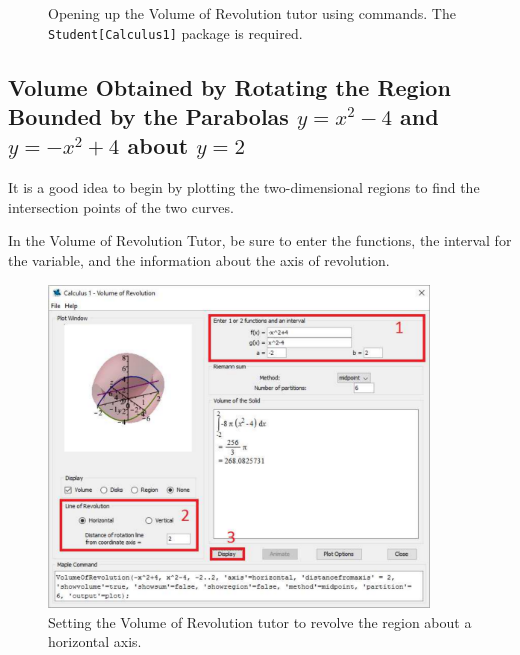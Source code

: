 \begin{figure}[h]
\caption{Opening up the Volume of Revolution tutor using commands. The \texttt{Student[Calculus1]} package is required.}
\centering
{}
\end{figure}

\newpage

\subsection{Volume Obtained by Rotating the Region Bounded by the Parabolas $y=x^2-4$ and $y=-x^2+4$ about $y=2$}


It is a good idea to begin by plotting the two-dimensional regions to find the intersection points of the two curves.

\begin{maplegroup}
\begin{mapleinput}
\end{mapleinput}
\mapleresult
{}
\end{maplegroup}

In the Volume of Revolution Tutor, be sure to enter the functions, the interval for the variable, and the information about the axis of revolution.

\begin{figure}
\caption{Setting the Volume of Revolution tutor to revolve the region about a horizontal axis.}
\centering
\includegraphics[width=0.9\textwidth]{tutorials/figures/VoRTutorQ1-1-eps-converted-to.pdf}
\end{figure}

